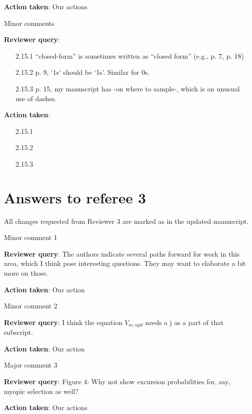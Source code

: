 \documentclass[a4paper]{article}
\newcounter{reviewer}
\def\reply{\textbf{Reviewer query}}
\def\action{\textbf{Action taken}}
\newcommand{\trevcomment}[1]{{\color{violet}{\{Rev 3: #1\}}}}
\begin{document}
\begin{answers}
\action: Our actions

\item{Minor comments}\label{q26}

\reply: \begin{itemize}[noitemsep,topsep=0pt,parsep=0pt,partopsep=0pt]

\item[2.15.1] “closed-form” is sometimes written as “closed form” (e.g., p. 7, p. 18)

\item[2.15.2] p. 9, `1s` should be ‘1s’. Similar for 0s.

\item[2.15.3] p. 15, my manuscript has -on where to sample-, which is an unusual use of dashes.

\end{itemize}

\action:
\begin{itemize}[noitemsep,topsep=0pt,parsep=0pt,partopsep=0pt]

\item[2.15.1] 
\item[2.15.2] 
\item[2.15.3] 

\end{itemize}

\end{answers}
\section*{Answers to referee 3}
All changes requested from Reviewer 3 are marked as \trevcomment{violet text}
in the updated manuscript.

\setcounter{reviewer}{3}

\begin{answers}

\item{Minor comment 1}\label{q27}

\reply: The authors indicate several paths forward for work in this area, which I think pose interesting questions. They may want to elaborate
a bit more on those.

\action: Our action

\item{Minor comment 2}\label{q28}

\reply: I think the equation $V_{m,upd}$ needs a j as a part of that subscript.

\action: Our action

\item{Major comment 3}\label{q29}

\reply: Figure 4: Why not show excursion probabilities for, say, myopic selection as well?

\action: Our actions

\end{answers}
\end{document}
